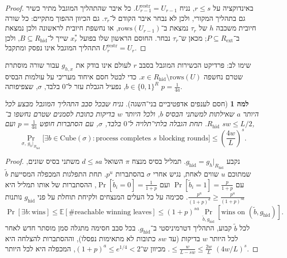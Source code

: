 \documentclass[11pt,a4paper]{article}
\newtheorem{lemma}[theorem]{למה}
\theoremstyle{definition}
\theoremstyle{remark}
\newcommand{\E}{\mathbb{E}}
\newcommand{\Prb}{\Pr}
\begin{document}
\begin{proof}
באינדוקציה על $r \le s$, נניח $U_{r-1}^{\mathrm{restr}} = U_{r-1}$. כל איבר שהתהליך המוגבל מתיר כשיר גם בתהליך המקורי, ולכן לא נבחר איבר הקודם ל־$\tau_r$. גם הכיוון ההפוך מתקיים: כל שורה חיובית משכבה $h$ של $\tau_r$ נמצאת ב־$\mathrm{rows}(U_{r-1})$, או נחשפת חיובית לראשונה ולכן נמצאת ב־$P \subseteq R_{\mathrm{ext}}$; מכאן ש־$\tau_r$ נבחר. החוסם הראשון שלו בפועל $x_r^*$ שייך ל־$B \subseteq R_{\mathrm{hid}}$, ולכן התהליך המוגבל אינו נפסק ומתקבל $U_r^{\mathrm{restr}} = U_r$.
\end{proof}

שימו לב: פרדיקט הכשירות המוגבל בסבב $r$ לעולם אינו בודק את $g_{h,x}$ עבור שורה מוסתרת שטרם נחשפה $x \in R_{\mathrm{hid}} \setminus \mathrm{rows}(U)$. כדי לבטל חסם איחוד מעריכי על עולמות הבסיס $b \in \{0,1\}^R$, נפעיל הגבלת עזר ל־$0$ בלבד, $\sigma$, שצפיפותה $p = \frac{1}{4a}$.

\begin{lemma}[חסם לענפים אדפטיביים בני־השגה]
\label{lem:reachable-branch}
נניח שבכל סבב התהליך המוגבל מבצע לכל היותר $a$ שאילתות למשתני הבסיס $b$, ולכל היותר $w$ בדיקות כתובת לסמנים שטרם נחשפו ב־$R_{\mathrm{hid}}$. תחת הגבלה בלתי־תלויה ל־$0$ בלבד, $\sigma$, עם הסתברות חופש $p = \frac{1}{4a}$ ועם $sw \le L/2$,
\[
  \Prb_{\sigma,\, g_h|_{R_{\mathrm{hid}}}}\bigl[\exists b \in \mathrm{Cube}(\sigma) : \text{process completes } s \text{ blocking rounds}\bigr]
  \le \left(\frac{4w}{L}\right)^s.
\]
\end{lemma}

\begin{proof}
נקבע $g_{\mathrm{hid}} = g_h|_{R_{\mathrm{hid}}}$. תמליל בסיס מנצח $\pi$ השואל $d \le sa$ משתני בסיס שונים, שמתוכם $u$ שווים לאחת, נגיש אחרי $\sigma$ בהסתברות $p^u$. תחת התפלגות המכפלה המסייעת $\tilde{b}$ עם $\Prb[\tilde{b}_i = 1] = \frac{p}{1+p}$ ועם $\Prb[\tilde{b}_i = 0] = \frac{1}{1+p}$, ההסתברות של אותו תמליל היא $\frac{p^u}{(1+p)^d} \ge \frac{p^u}{(1+p)^{sa}}$. סכימה על כל העלים המנצחים ולקיחת תוחלת על פני $g_{\mathrm{hid}}$ נותנות
\[
  \Prb[\exists b : \text{wins}] \le \E[\#\text{reachable winning leaves}]
  \le (1+p)^{sa}\, \Prb_{\tilde{b}, g_{\mathrm{hid}}}[\text{wins on } (\tilde{b}, g_{\mathrm{hid}})].
\]
לכל $\tilde{b}$ קבוע, התהליך דטרמיניסטי ב־$g_{\mathrm{hid}}$. בכל סבב חסימה מתגלה סמן מוסתר חדש לאחר לכל היותר $w$ בדיקות (עד $sw$ כתובות לא מתאימות נפסלו), וההסתברות להצלחה היא $\le \frac{w}{L - sw} \le \frac{2w}{L}$. מכיוון ש־$(1+p)^a \le e^{1/4} < 2$, המכפלה היא לכל היותר $(4w/L)^s$.
\end{proof}
\end{document}
